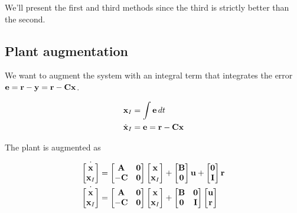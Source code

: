 We'll present the first and third methods since the third is strictly better
than the second.

\subsection{Plant augmentation}

We want to augment the system with an integral term that integrates the error
$\mathbf{e} = \mathbf{r} - \mathbf{y} = \mathbf{r} - \mathbf{C}\mathbf{x}$.

\begin{align*}
  \mathbf{x}_I &= \int \mathbf{e} \,dt \\
  \dot{\mathbf{x}}_I &= \mathbf{e} = \mathbf{r} - \mathbf{C}\mathbf{x}
\end{align*}

The plant is augmented as

\begin{align*}
  \dot{\begin{bmatrix}
    \mathbf{x} \\
    \mathbf{x}_I
  \end{bmatrix}} &=
  \begin{bmatrix}
    \mathbf{A} & \mathbf{0} \\
    -\mathbf{C} & \mathbf{0}
  \end{bmatrix}
  \begin{bmatrix}
    \mathbf{x} \\
    \mathbf{x}_I
  \end{bmatrix} +
  \begin{bmatrix}
    \mathbf{B} \\
    \mathbf{0}
  \end{bmatrix}
  \mathbf{u} +
  \begin{bmatrix}
    \mathbf{0} \\
    \mathbf{I}
  \end{bmatrix}
  \mathbf{r} \\
  \dot{\begin{bmatrix}
    \mathbf{x} \\
    \mathbf{x}_I
  \end{bmatrix}} &=
  \begin{bmatrix}
    \mathbf{A} & \mathbf{0} \\
    -\mathbf{C} & \mathbf{0}
  \end{bmatrix}
  \begin{bmatrix}
    \mathbf{x} \\
    \mathbf{x}_I
  \end{bmatrix} +
  \begin{bmatrix}
    \mathbf{B} & \mathbf{0} \\
    \mathbf{0} & \mathbf{I}
  \end{bmatrix}
  \begin{bmatrix}
    \mathbf{u} \\
    \mathbf{r}
  \end{bmatrix}
\end{align*}

